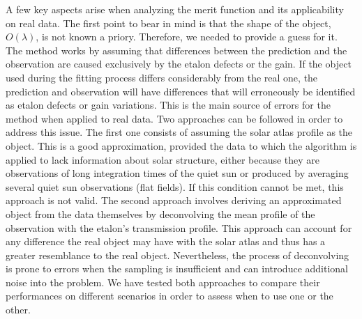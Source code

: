 A few key aspects arise when analyzing the merit function and its applicability on real data. The first point to bear in mind is that the shape of the object, $O(\lambda)$, is not known a priory. Therefore, we needed to provide a guess for it. The method works by assuming that differences between the prediction and the observation are caused exclusively by the etalon defects or the gain. If the object used during the fitting process differs considerably from the real one, the prediction and observation will have differences that will erroneously be identified as etalon defects or gain variations. This is the main source of errors for the method when applied to real data. Two approaches can be followed in order to address this issue. The first one consists of assuming the solar atlas profile as the object. This is a good approximation, provided the data to which the algorithm is applied to lack information about solar structure, either because they are observations of long integration times of the quiet sun or produced by averaging several quiet sun observations (flat fields). If this condition cannot be met, this approach is not valid. The second approach involves deriving an approximated object from the data themselves by deconvolving the mean profile of the observation with the etalon's transmission profile. This approach can account for any difference the real object may have with the solar atlas and thus has a greater resemblance to the real object. Nevertheless, the process of deconvolving is prone to errors when the sampling is insufficient and can introduce additional noise into the problem. We have tested both approaches to compare their performances on different scenarios in order to assess when to use one or the other.

